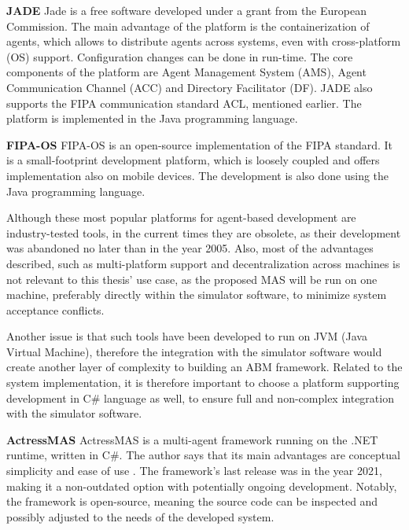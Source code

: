 \documentclass[main.tex]{subfiles}
\begin{document}
\textbf{JADE} \smallskip \newline 
Jade is a free software developed under a grant from the European Commission. The main advantage of the 
platform is the containerization of agents, which allows to distribute agents across systems, even 
with cross-platform (OS) support. Configuration changes can be done in run-time. The core components of 
the platform are Agent Management System (AMS), Agent Communication Channel (ACC) and Directory Facilitator (DF). 
JADE also supports the FIPA communication standard ACL, mentioned earlier. The platform is implemented in 
the Java programming language.

\textbf{FIPA-OS} \smallskip \newline 
FIPA-OS is an open-source implementation of the FIPA standard. It is a small-footprint development platform, 
which is loosely coupled and offers implementation also on mobile devices. The development is also done 
using the Java programming language. 

Although these most popular platforms for agent-based development are industry-tested tools, in the current 
times they are obsolete, as their development was abandoned no later than in the year 2005. Also, most of the 
advantages described, such as multi-platform support and decentralization across machines is not relevant to 
this thesis' use case, as the proposed MAS will be run on one machine, preferably directly within the simulator 
software, to minimize system acceptance conflicts. 

Another issue is that such tools have been developed to run on JVM (Java Virtual Machine), therefore the integration 
with the simulator software would create another layer of complexity to building an ABM framework. 
Related to the system implementation, it is therefore important to choose a platform supporting 
development in C\# language as well, to ensure full and non-complex integration with the simulator 
software.

\textbf{ActressMAS} \smallskip \newline
ActressMAS is a multi-agent framework running on the .NET runtime, written in C\#. The author says that 
its main advantages are conceptual simplicity and ease of use \cite{Leon2022}. The framework's last release was 
in the year 2021, making it a non-outdated option with potentially ongoing development. Notably, the framework is 
open-source, meaning the source code can be inspected and possibly adjusted to the needs of the developed system.
\end{document}
